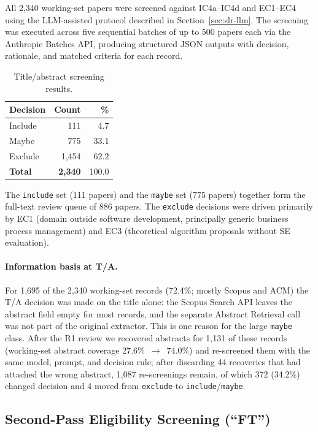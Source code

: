 All 2{,}340 working-set papers were screened against IC4a--IC4d and EC1--EC4
using the LLM-assisted protocol described in Section~\ref{sec:slr-llm}. The
screening was executed across five sequential batches of up to 500 papers each
via the Anthropic Batches API, producing structured JSON outputs with decision,
rationale, and matched criteria for each record.

\begin{table}[htbp]
\centering
\caption{Title/abstract screening results.}
\label{tab:ta-screening}
\begin{tabular}{lrr}
\toprule
\textbf{Decision} & \textbf{Count} & \textbf{\%} \\
\midrule
Include & 111 & 4.7 \\
Maybe   & 775 & 33.1 \\
Exclude & 1{,}454 & 62.2 \\
\midrule
\textbf{Total} & \textbf{2{,}340} & 100.0 \\
\bottomrule
\end{tabular}
\end{table}

The \texttt{include} set (111 papers) and the \texttt{maybe} set (775 papers)
together form the full-text review queue of 886 papers. The
\texttt{exclude} decisions were driven primarily by EC1 (domain outside
software development, principally generic business process management) and EC3
(theoretical algorithm proposals without SE evaluation).

\paragraph{Information basis at T/A.} For 1{,}695 of the 2{,}340 working-set
records (72.4\%; mostly Scopus and ACM) the T/A decision was made on the
title alone: the Scopus Search API leaves the abstract field empty for most
records, and the separate Abstract Retrieval call was not part of the
original extractor. This is one reason for the large \texttt{maybe} class.
After the R1 review we recovered abstracts for 1{,}131 of these records
(working-set abstract coverage 27.6\%~$\rightarrow$~74.0\%) and re-screened
them with the same model, prompt, and decision rule; after discarding 44
recoveries that had attached the wrong abstract, 1{,}087 re-screenings
remain, of which 372 (34.2\%) changed decision and 4 moved from
\texttt{exclude} to \texttt{include}/\texttt{maybe}. 

\subsection{Second-Pass Eligibility Screening (``FT'')}

